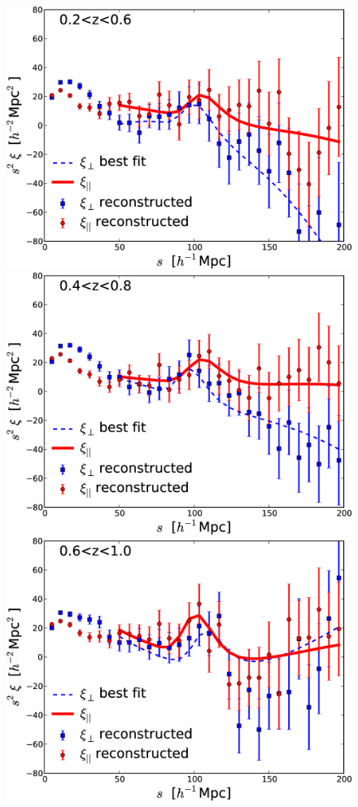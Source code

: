 \documentclass[iop,twocolappendix]{emulateapj}
\begin{document}
\begin{figure}[!h]
\begin{center}
\includegraphics[width=0.9\columnwidth]{figures/WiggleZ_post_rec_Xiwedges_z26/WiggleZ_pre_post_rec_Xiwedges_z26}
\includegraphics[width=0.9\columnwidth]{figures/WiggleZ_post_rec_Xiwedges_z48/WiggleZ_pre_post_rec_Xiwedges_z48}
\includegraphics[width=0.9\columnwidth]{figures/WiggleZ_post_rec_Xiwedges_z60/WiggleZ_pre_post_rec_Xiwedges_z60}

\end{center}
\end{figure}
\end{document}
